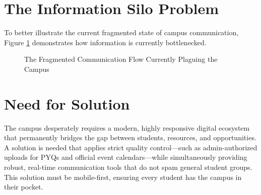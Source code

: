 \section{The Information Silo Problem}
To better illustrate the current fragmented state of campus communication, Figure \ref{fig:silo_diagram} demonstrates how information is currently bottlenecked.

\begin{figure}[htbp]
\centering
{}
\caption{The Fragmented Communication Flow Currently Plaguing the Campus}
\label{fig:silo_diagram}
\end{figure}

\section{Need for Solution}
The campus desperately requires a modern, highly responsive digital ecosystem that permanently bridges the gap between students, resources, and opportunities. A solution is needed that applies strict quality control—such as admin-authorized uploads for PYQs and official event calendars—while simultaneously providing robust, real-time communication tools that do not spam general student groups. This solution must be mobile-first, ensuring every student has the campus in their pocket.